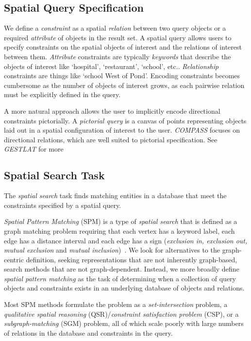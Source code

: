 \subsection{Spatial Query Specification}
\par{
    We define a \textit{constraint} as a spatial \textit{relation} between two query objects or a required \textit{attribute} of objects in the result set.
    A spatial query allows users to specify constraints on the spatial objects of interest and the relations of interest between them.
    \textit{Attribute} constraints are typically \textit{keywords} that describe the objects of interest like `hospital', `restaurant', `school', etc..
    \textit{Relationship} constraints are things like `school West of Pond'.
    Encoding constraints becomes cumbersome as the number of objects of interest grows, as each pairwise relation must be explicitly defined in the query.
    
    A more natural approach allows the user to implicitly encode directional constraints pictorially.
    A \textit{pictorial query} is a canvas of points representing objects laid out in a spatial configuration of interest to the user. \emph{COMPASS} focuses on directional relations, which are well suited to pictorial specification.
    See \emph{GESTLAT} for more~\cite{Osul2023}
}


\subsection{Spatial Search Task}
\par{
    The \textit{spatial search} task finds matching entities in a database that meet the constraints specified by a spatial query.

    \textit{Spatial Pattern Matching} (SPM) is a type of \textit{spatial search } that is defined as a graph matching problem requiring that each vertex has a keyword label, each edge has a distance interval and each edge has a sign (\textit{exclusion in, exclusion out, mutual exclusion} and \textit{mutual inclusion})~\cite{Fang2019}.
    We look for alternatives to the graph-centric definition, seeking representations that are not inherently graph-based, search methods that are not graph-dependent. 
    Instead, we more broadly define \textit{spatial pattern matching} as the task of determining when a collection of query objects and constraints exists in an underlying database of objects and relations.

    Most SPM methods formulate the problem as a \textit{set-intersection} problem, a \textit{qualitative spatial reasoning} (QSR)/\textit{constraint satisfaction problem} (CSP), or a \textit{subgraph-matching} (SGM) problem, all of which scale poorly with large numbers of relations in the database and constraints in the query. 
}




